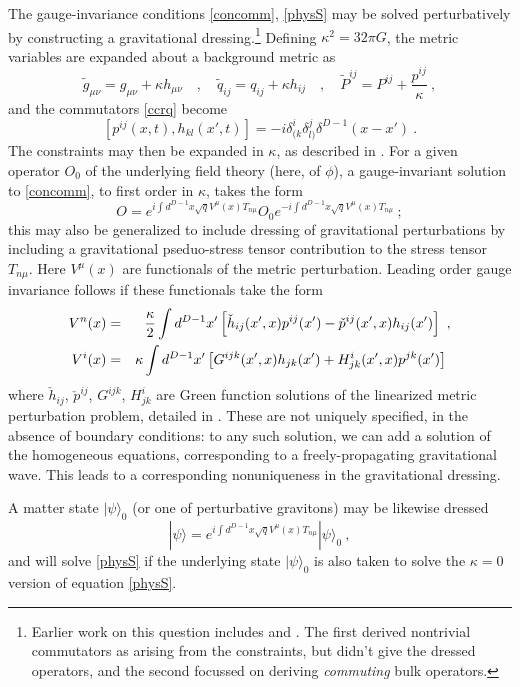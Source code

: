 \documentclass[11pt]{article}
\numberwithin{equation}{section}
\newcommand{\beq}{\begin{equation}}
\newcommand{\eeq}{\end{equation}}
\newcommand{\bea}{\begin{eqnarray}}
\newcommand{\eea}{\end{eqnarray}}
\begin{document}
The gauge-invariance conditions \eqref{concomm}, \eqref{physS} may be solved perturbatively by constructing a gravitational dressing\cite{SGAlg,DoGi1,DoGi2,DoGi3,QGQF}\cite{DoGi4,SGsplit}.\footnote{Earlier work on this question includes \cite{Heem} and  \cite{KaLigrav}.   The first derived nontrivial commutators as arising from the constraints, but didn't give the dressed operators, and the second focussed on deriving {\it commuting} bulk operators.}  Defining $\kappa^2=32\pi G$, the metric variables are expanded about a background metric as
\beq
\tilde g_{\mu\nu} = g_{\mu\nu} + \kappa h_{\mu\nu}\quad  , \quad 
\tilde q_{ij}= q_{ij} + \kappa h_{ij}\quad ,\quad
\tilde P^{ij} = P^{ij} + \frac{p^{ij}}{\kappa}\ ,
\eeq
and the commutators \eqref{ccrq} become
\beq\label{Pcom}
[p^{ij}(x,t),h_{kl}(x',t)] = -i \delta^i_{(k}\delta^j_{l)} \delta^{D-1}(x-x')\ .
\eeq
The constraints may then be expanded in $\kappa$, as described in \cite{GiPe2}.  
For a given operator $O_0$ of the underlying field theory (here, of $\phi$), a gauge-invariant solution to \eqref{concomm}, to first order in $\kappa$, takes the form
\beq\label{invO}
O=e^{i\int d^{D-1}x \sqrt{q} V^\mu(x)T_{n\mu} } O_0 e^{-i\int d^{D-1}x \sqrt{q} V^\mu(x) T_{n\mu} }\ ;
\eeq
this may also be generalized to include dressing of gravitational perturbations by including a gravitational pseduo-stress tensor contribution to the stress tensor $T_{n\mu}$.  Here $V^\mu(x)$ are functionals of the metric perturbation.  Leading order gauge invariance follows if these functionals take the form
\bea\label{genv}
V^n(x)&=&\frac{\kappa}{2} \int d^{D-1}x' \left[ \check h_{ij}(x',x) p^{ij}(x') - \check p^{ij}(x',x) h_{ij}(x')\right]\ ,\cr
V^i(x)&=& \kappa \int d^{D-1}x' \left[ G^{ijk}(x',x)h_{jk}(x') + H^i_{jk}(x',x) p^{jk}(x')\right]\ 
\eea
where $\check h_{ij}$,  $\check p^{ij}$, $G^{ijk}$, $H^i_{jk}$ are Green function solutions of the linearized metric perturbation problem, detailed in \cite{GiPe2}.  These are not uniquely specified, in the absence of boundary conditions: to any such solution, we can add a solution of the homogeneous equations, corresponding to a freely-propagating gravitational wave.  This leads to a corresponding nonuniqueness in the gravitational dressing.

A matter state $|\psi\rangle_0$ (or one of perturbative gravitons) may be likewise dressed
\beq\label{GIstate}
|\psi\rangle = e^{i\int d^{D-1}x \sqrt{q} V^\mu(x)T_{n\mu} } |\psi\rangle_0\ ,
\eeq
and will solve \eqref{physS} if the underlying state $|\psi\rangle_0$ is also taken to solve the $\kappa=0$ version of equation \eqref{physS}.
\end{document}
